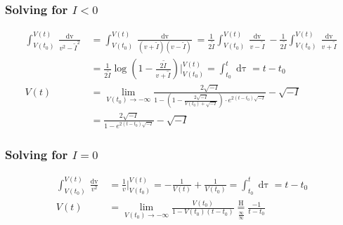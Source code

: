 \subsubsection*{Solving for \texorpdfstring{$I < 0$}{TEXT}}
\begin{align*}
\int_{V(t_0)}^{V(t)} \frac{\mathop{dv}}{v^2 - \tilde{I}^2} &= \int_{V(t_0)}^{V(t)} \frac{\mathop{dv}}{(v+\tilde{I})(v-\tilde{I})} 
= \frac{1}{2 \tilde{I}} \int_{V(t_0)}^{V(t)} \frac{\mathop{dv}}{v-\tilde{I}}-\frac{1}{2 \tilde{I}} \int_{V(t_0)}^{V(t)} \frac{\mathop{dv}}{v+\tilde{I}} \\
&= \frac{1}{2 \tilde{I}} \log \left(1-\frac{2 \tilde{I}}{v+\tilde{I}}\right) \Big \rvert_{V(t_0)}^{V(t)} 
= \int_{t_0}^t \mathop{d\tau} = t - t_0 \\
V(t) &= \lim_{V(t_0) \rightarrow -\infty} \frac{2 \sqrt{-I}}{1 - \left(1-\frac{2 \sqrt{-I}}{V(t_0)+\sqrt{-I}}\right)\cdot e^{2 (t - t_0)\sqrt{-I}}}-\sqrt{-I}\\
&= \frac{2 \sqrt{-I}}{1 - e^{2 (t - t_0) \sqrt{-I}}}-\sqrt{-I}
\end{align*}

\subsubsection{Solving for \texorpdfstring{$I = 0$}{TEXT}}
\begin{align*}
\int_{V(t_0)}^{V(t)} \frac{\mathop{dv}}{v^2} &= \frac{1}{v}\Big\rvert_{V(t_0)}^{V(t)} = - \frac{1}{V(t)} + \frac{1}{V(t_0)} = \int_{t_0}^t \mathop{d\tau} = t -t_0 \\
V(t) &= \lim_{V(t_0) \rightarrow - \infty} \frac{V(t_0)}{1-V(t_0)(t - t_0)} \underset{\frac{\infty}{\infty}}{\overset{\mathrm{H}}{=}} \frac{-1}{t - t_0}
\end{align*}

